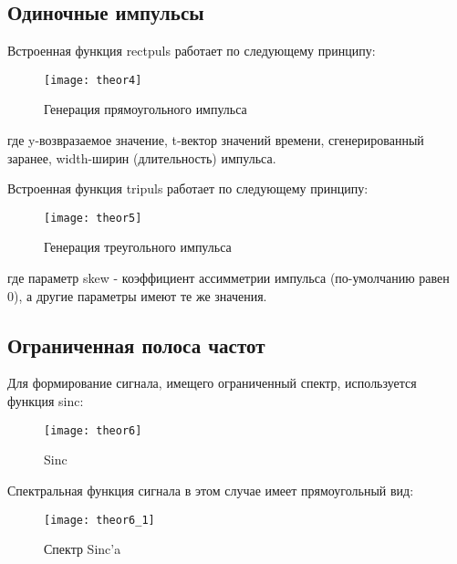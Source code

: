 \subsection{Одиночные импульсы}
Встроенная функция rectpuls работает по следующему принципу:
\begin{figure}[H]
	\begin{center}
		\texttt{[image: theor4]}
		\caption{Генерация прямоугольного импульса} 
		\label{pic:theor4} %
	\end{center}
\end{figure}
где y-возвразаемое значение, t-вектор значений времени, сгенерированный заранее, width-ширин (длительность) импульса.

Встроенная функция tripuls работает по следующему принципу:
\begin{figure}[H]
	\begin{center}
		\texttt{[image: theor5]}
		\caption{Генерация треугольного импульса} 
		\label{pic:theor5} %
	\end{center}
\end{figure}
где параметр skew - коэффициент ассимметрии импульса (по-умолчанию равен 0), а другие параметры имеют те же значения.

\subsection{Ограниченная полоса частот}
Для формирование сигнала, имещего ограниченный спектр, используется функция sinc:
\begin{figure}[H]
	\begin{center}
		\texttt{[image: theor6]}
		\caption{Sinc} 
		\label{pic:theor6} %
	\end{center}
\end{figure}
Спектральная функция сигнала в этом случае имеет прямоугольный вид:
\begin{figure}[H]
	\begin{center}
		\texttt{[image: theor6\_1]}
		\caption{Спектр Sinc'a} 
		\label{pic:theor6_1} %
	\end{center}
\end{figure}

